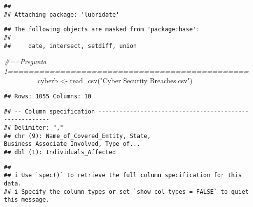\documentclass[
]{article}
\newenvironment{Shaded}{\begin{snugshade}}{\end{snugshade}}
\newcommand{\CommentTok}[1]{\textcolor[rgb]{0.56,0.35,0.01}{\textit{#1}}}
\newcommand{\FunctionTok}[1]{\textcolor[rgb]{0.00,0.00,0.00}{#1}}
\newcommand{\NormalTok}[1]{#1}
\newcommand{\OtherTok}[1]{\textcolor[rgb]{0.56,0.35,0.01}{#1}}
\newcommand{\StringTok}[1]{\textcolor[rgb]{0.31,0.60,0.02}{#1}}
\begin{document}
\begin{verbatim}
## 
## Attaching package: 'lubridate'
\end{verbatim}

\begin{verbatim}
## The following objects are masked from 'package:base':
## 
##     date, intersect, setdiff, union
\end{verbatim}

\begin{Shaded}
\begin{Highlighting}[]
\CommentTok{\#==Pregunta 1====================================================}
\NormalTok{cyberb }\OtherTok{\textless{}{-}} \FunctionTok{read\_csv}\NormalTok{(}\StringTok{"Cyber Security Breaches.csv"}\NormalTok{)}
\end{Highlighting}
\end{Shaded}

\begin{verbatim}
## Rows: 1055 Columns: 10
\end{verbatim}

\begin{verbatim}
## -- Column specification --------------------------------------------------------
## Delimiter: ","
## chr (9): Name_of_Covered_Entity, State, Business_Associate_Involved, Type_of...
## dbl (1): Individuals_Affected
\end{verbatim}

\begin{verbatim}
## 
## i Use `spec()` to retrieve the full column specification for this data.
## i Specify the column types or set `show_col_types = FALSE` to quiet this message.
\end{verbatim}
\end{document}
